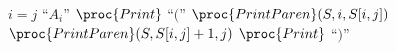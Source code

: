 \begin{codebox}
\li \If $i = j$
\li \Then {} ``$A_i$''
\li \Else
\li     $\proc{Print}$ ``$($''
\li     $\proc{PrintParen}(S,i,S[i,j])$
\li     $\proc{PrintParen}(S,S[i,j]+1,j)$
\li     $\proc{Print}$ ``$)$''
\end{codebox}